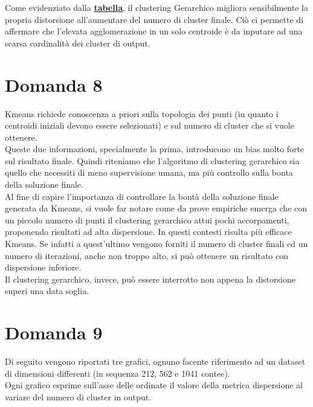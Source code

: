 \documentclass{article}
\begin{document}
\noindent Come evidenziato dalla \hyperlink{fig:test}{\textbf{tabella}}, il clustering Gerarchico migliora sensibilmente la propria distorsione all'aumentare del numero di cluster finale.
Ciò ci permette di affermare che l'elevata agglomerazione in un solo centroide è da inputare ad una scarsa cardinalità dei cluster di output.


\section*{Domanda 8}
Kmeans richiede conoscenza a priori sulla topologia dei punti (in quanto i centroidi iniziali devono essere selezionati) e sul numero di cluster che si vuole ottenere.\\
Queste due informazioni, specialmente la prima, introducono un bias molto forte sul risultato finale.
Quindi riteniamo che l'algoritmo di clustering gerarchico sia quello che necessiti di meno supervisione umana, ma più controllo sulla bonta della soluzione finale.\\
Al fine di capire l'importanza di controllare la bontà della soluzione finale generata da Kmeans, si vuole far notare come da prove empiriche emerga che con un piccolo numero di punti il clustering gerarchico attui pochi accorpamenti, proponendo risultati ad alta dispersione. In questi contesti risulta più efficace Kmeans. Se infatti a quest'ultimo vengono forniti il numero di cluster finali ed un numero di iterazioni, anche non troppo alto, si può ottenere un risultato con dispersione inferiore. \\ 
Il clustering gerarchico, invece, può essere interrotto non appena la distorsione superi una data soglia.

\section*{Domanda 9}
Di seguito vengono riportati tre grafici, ognuno facente riferimento ad un dataset di dimensioni differenti (in sequenza 212, 562 e 1041 contee). \\
Ogni grafico esprime sull'asse delle ordinate il valore della metrica dispersione al variare del numero di cluster in output.\\
\end{document}
